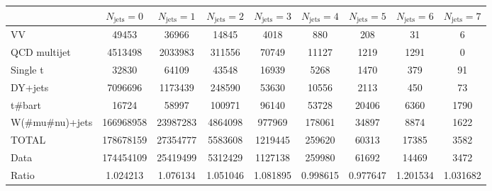 \footnotesize{
\begin{tabular}{l|cccccccc} 
  &  $N_{\text{jets}} = 0 $ & $N_{\text{jets}} = 1 $ & $N_{\text{jets}} = 2 $ & $N_{\text{jets}} = 3 $ & $N_{\text{jets}} = 4 $ & $N_{\text{jets}} = 5 $ & $N_{\text{jets}} = 6 $ & $N_{\text{jets}} = 7$ \\ \hline 
   VV        & 49453 & 36966 & 14845 & 4018 & 880 & 208 & 31 & 6 \\ 
   QCD multijet        & 4513498 & 2033983 & 311556 & 70749 & 11127 & 1219 & 1291 & 0 \\ 
   Single t        & 32830 & 64109 & 43548 & 16939 & 5268 & 1470 & 379 & 91 \\ 
   DY+jets        & 7096696 & 1173439 & 248590 & 53630 & 10556 & 2113 & 450 & 73 \\ 
   t#bar{t}        & 16724 & 58997 & 100971 & 96140 & 53728 & 20406 & 6360 & 1790 \\ 
   W(#mu#nu)+jets        & 166968958 & 23987283 & 4864098 & 977969 & 178061 & 34897 & 8874 & 1622 \\ 
 \hline 
 TOTAL & 178678159 & 27354777 & 5583608 & 1219445 & 259620 & 60313 & 17385 & 3582 \\ 
 \hline 
 Data          & 174454109 & 25419499 & 5312429 & 1127138 & 259980 & 61692 & 14469 & 3472 \\ 
  Ratio          & 1.024213 & 1.076134 & 1.051046 & 1.081895 & 0.998615 & 0.977647 & 1.201534 & 1.031682 \\ 
 \end{tabular}}